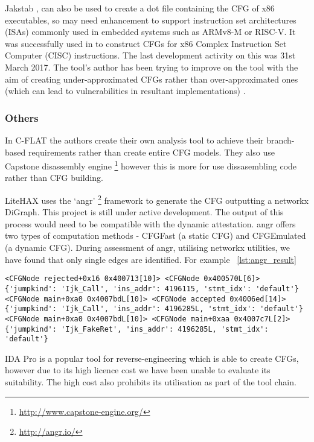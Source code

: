 Jakstab \cite{Kinder2008},\cite{Kinder2010} can also be used to create a dot file containing the CFG of x86 executables, so may need enhancement to support instruction set architectures (ISAs) commonly used in embedded systems such as ARMv8-M or RISC-V. It was successfully used in \cite{Nguyen2013} to construct CFGs for x86 Complex Instruction Set Computer (CISC) instructions. The last development activity on this was 31st March 2017. The tool's author has been trying to improve on the tool with the aim of creating under-approximated CFGs rather than over-approximated ones (which can lead to vulnerabilities in resultant implementations) \cite{Kinder2012}.

\subsubsection*{Others}

In C-FLAT \cite{Abera2016} the authors create their own analysis tool to achieve their branch-based requirements rather than create entire CFG models. They also use Capstone disassembly engine \footnote{\url{http://www.capstone-engine.org/}} however this is more for use dissasembling code rather than CFG building.

LiteHAX \cite{Dessouky2018} uses the `angr' \footnote{\url{http://angr.io/}} \cite{Shoshitaishvili2016} framework to generate the CFG outputting a networkx \cite{Hagberg2008} DiGraph. This project is still under active development. The output of this process would need to be compatible with the dynamic attestation. angr offers two types of computation methods - CFGFast (a static CFG) and CFGEmulated (a dynamic CFG).
During assessment of angr, utilising networkx utilities, we have found that only single edges are identified. For example ~\ref{lst:angr_result}

\begin{lstlisting}[caption={Example of results from angr CFG analysis of fauxware in form of .edgelist output from networkx utilities},label={lst:angr_result}]
<CFGNode rejected+0x16 0x400713[10]> <CFGNode 0x400570L[6]> {'jumpkind': 'Ijk_Call', 'ins_addr': 4196115, 'stmt_idx': 'default'}
<CFGNode main+0xa0 0x4007bdL[10]> <CFGNode accepted 0x4006ed[14]> {'jumpkind': 'Ijk_Call', 'ins_addr': 4196285L, 'stmt_idx': 'default'}
<CFGNode main+0xa0 0x4007bdL[10]> <CFGNode main+0xaa 0x4007c7L[2]> {'jumpkind': 'Ijk_FakeRet', 'ins_addr': 4196285L, 'stmt_idx': 'default'}
\end{lstlisting}

IDA Pro is a popular tool for reverse-engineering which is able to create CFGs, however due to its high licence cost we have been unable to evaluate its suitability. The high cost also prohibits its utilisation as part of the tool chain.

